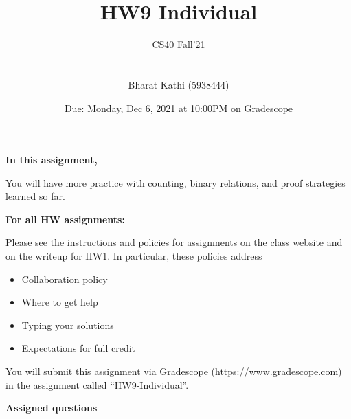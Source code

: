 \documentclass[12pt, oneside]{article}
\title{HW9 Individual}
\author{CS40 Fall'21\\\\\\
Bharat Kathi (5938444)}
\date{Due: Monday, Dec 6, 2021 at 10:00PM on Gradescope}
\begin{document}
\maketitle

{\bf In this assignment,}

You will have more practice with counting, binary relations, and proof strategies learned so far.


{\bf For all HW assignments:}

Please see the instructions and policies for assignments on the class website and on the writeup for HW1.  In particular, these policies address
\begin{multicols}{2}
\begin{itemize}
\item Collaboration policy
\item Where to get help
\item Typing your solutions
\item Expectations for full credit
\end{itemize}
\end{multicols}


You will submit this assignment via Gradescope
(\href{https://www.gradescope.com}{https://www.gradescope.com}) in the assignment called ``HW9-Individual''.

\newpage

{\bf Assigned questions}
\end{document}
